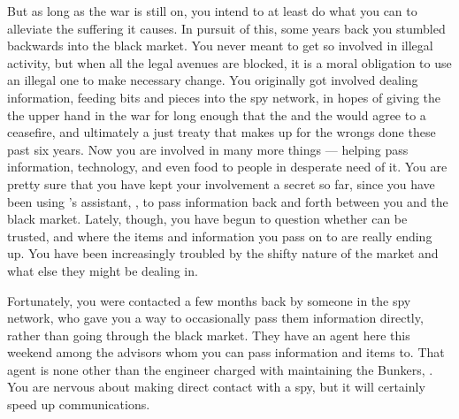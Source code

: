 \documentclass[char]{GL2020}
\begin{document}
But as long as the war is still on, you intend to at least do what you can to alleviate the suffering it causes. In pursuit of this, some years back you stumbled backwards into the black market. You never meant to get so involved in illegal activity, but when all the legal avenues are blocked, it is a moral obligation to use an illegal one to make necessary change. You originally got involved dealing information, feeding bits and pieces into the \pShip{} spy network, in hopes of giving the \pShippies{} the upper hand in the war for long enough that the \pFarm{} and the \pTech{} would agree to a ceasefire, and ultimately a just treaty that makes up for the wrongs done these past six years. Now you are involved in many more things — helping pass information, technology, and even food to people in desperate need of it. You are pretty sure that you have kept your involvement a secret so far, since you have been using \cLibrarian{\full}'s assistant, \cLibAssist{\full}, to pass information back and forth between you and the black market. Lately, though, you have begun to question whether \cLibAssist{\they} can be trusted, and where the items and information you pass on to \cLibAssist{\them} are really ending up. You have been increasingly troubled by the shifty nature of the market and what else they might be dealing in. 

Fortunately, you were contacted a few months back by someone in the \pShip{} spy network, who gave you a way to occasionally pass them information directly, rather than going through the black market. They have an agent here this weekend among the \pShip{} advisors whom you can pass information and items to. That agent is none other than the engineer charged with maintaining the Bunkers, \cBunker{\full}. You are nervous about making direct contact with a \pShip{} spy, but it will certainly speed up communications. 
\end{document}
